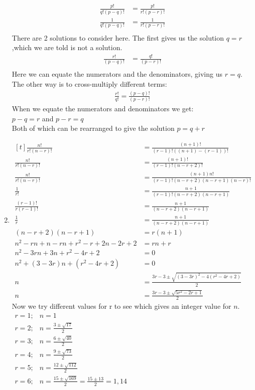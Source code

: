 \documentclass[../main.tex]{subfiles}
\begin{document}
\begin{enumerate}
    \begin{align*}
        \frac{p!}{q!(p-q)!}
        &=\frac{p!}{r!(p-r)!}\\
        \frac{1}{q!(p-q)!}
        &=\frac{1}{r!(p-r)!}\\
    \end{align*}
    There are 2 solutions to consider here. The first gives us the solution \(q=r \),which we are told is not a solution.\\
    \begin{align*}
        \frac{r!}{(p-q)!}
        &=\frac{q!}{(p-r)!}\\
    \end{align*}
    Here we can equate the numerators and the denominators, giving us \(r=q\).\\
    The other way is to cross-multiply different terms:\\
    \begin{align*}
    \frac{r!}{q!}=\frac{(p-q)!}{(p-r)!}
    \end{align*}
    When we equate the numerators and denominators we get:\\
    \(p-q=r\) and \(p-r=q\)\\
    Both of which can be rearranged to give the solution \(p=q+r\)
    \item 
    $
    \!
    \begin{aligned}[t]
    \frac{n!}{r!(n-r)!}
    &=\frac{(n+1)!}{(r-1)!((n+1)-(r-1))!}\\
    \frac{n!}{r!(n-r)!}
    &=\frac{(n+1)!}{(r-1)!(n-r+2)!}\\
    \frac{n!}{r!(n-r)!}
    &=\frac{(n+1)n!}{(r-1)!(n-r+2)(n-r+1)(n-r)!}\\
    \frac{1}{r!}
    &=\frac{n+1}{(r-1)!(n-r+2)(n-r+1)}\\
    \frac{(r-1)!}{r(r-1)!}
    &=\frac{n+1}{(n-r+2)(n-r+1)}\\
    \frac{1}{r}
    &=\frac{n+1}{(n-r+2)(n-r+1)}\\
    (n-r+2)(n-r+1)
    &=r(n+1)\\
    n^2 - rn + n -rn+r^2-r+2n-2r+2
    &=rn+r\\
    n^2-3rn+3n+r^2-4r+2
    &=0\\
    n^2+(3-3r)n+(r^2-4r+2)
    &=0\\
    n
    &=\frac{3r-3 \pm \sqrt{(3-3r)^2-4(r^2-4r+2)}}{2}\\
    n
    &=\frac{3r-3 \pm \sqrt{5r^2-2r+1}}{2}
    \end{aligned}
    $
\\
    Now we try different values for r to see which gives an integer value for \(n\).\\
    $
    \begin{aligned}
    r=1; &n=1\\
    r=2; &n=\frac{3 \pm \sqrt{17}}{2}\\
    r=3; &n=\frac{6 \pm \sqrt{40}}{2}\\
    r=4; &n=\frac{9 \pm \sqrt{73}}{2}\\
    r=5; &n=\frac{12 \pm \sqrt{112}}{2}\\
    r=6; &n=\frac{15 \pm \sqrt{169}}{2}=\frac{15\pm 13}{2}=1,14
    \end{aligned}
    $
\end{enumerate}
\end{document}
